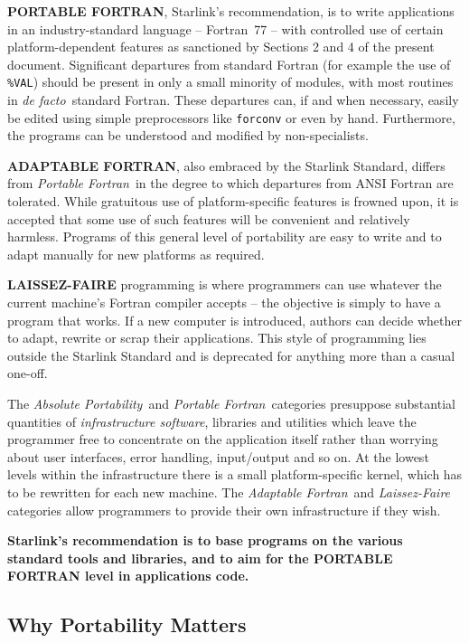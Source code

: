 \documentclass[twoside,11pt,nolof,noabs]{starlink}
\renewcommand{\_}{{\tt\char'137}}
\begin{document}
\textbf{PORTABLE FORTRAN}, Starlink's recommendation, is to write
applications in an industry-standard language --
Fortran~77 -- with controlled use of certain platform-dependent
features as sanctioned by Sections 2 and 4 of the present document.
Significant departures from
standard Fortran (for example the use of \verb|%VAL|) should be present
in only a small minority of modules, with most routines in \textit{de facto}\,
standard Fortran.  These departures can, if and when
necessary, easily be edited using simple preprocessors like
\verb|forconv| or even by hand.  Furthermore, the programs can be
understood and modified by non-specialists.

\textbf{ADAPTABLE FORTRAN}, also embraced by the Starlink Standard, differs
from \textit{Portable Fortran}\, in the degree to which
departures from ANSI Fortran are tolerated.  While gratuitous use of
platform-specific features is frowned upon, it is accepted that
some use of such features will be convenient and relatively
harmless.  Programs of this general level of portability are easy to
write and to adapt manually for new platforms as required.

\textbf{LAISSEZ-FAIRE} programming is where programmers can use whatever the
current machine's Fortran compiler accepts -- the objective is simply
to have a program that works.  If a new computer is introduced,
authors can decide whether to adapt, rewrite or scrap their applications.
This style of programming lies outside the Starlink Standard and
is deprecated for anything more than a casual one-off.

The \textit{Absolute Portability}\, and \textit{Portable Fortran}\,
categories presuppose substantial quantities of \textit{infrastructure
software}, libraries and utilities which leave the
programmer free to concentrate on the application itself rather than
worrying about user interfaces, error handling, input/output and
so on.  At the lowest levels within the infrastructure there is a
small platform-specific kernel, which has to be
rewritten for each new machine.  The \textit{Adaptable Fortran}\,
and \textit{Laissez-Faire}\, categories allow
programmers to provide their own infrastructure if they wish.

\textbf{Starlink's recommendation is to base programs on
the various standard tools and libraries, and to aim for the
PORTABLE FORTRAN level in applications code.}

\subsection{Why Portability Matters}
\end{document}
